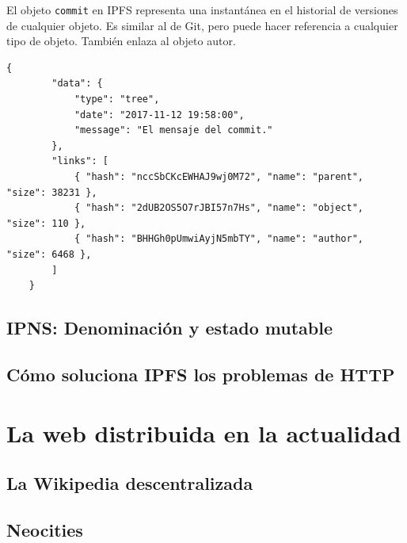 \documentclass[12pt]{article} %
\begin{document}
El objeto \texttt{commit} en IPFS representa una instantánea en el historial de versiones de cualquier objeto. Es similar al de Git, pero puede hacer referencia a cualquier tipo de objeto. También enlaza al objeto autor.

\begin{lstlisting}[caption={Estructura JSON de un \texttt{commit}.}]
	{
		"data": {
			"type": "tree",
			"date": "2017-11-12 19:58:00",
			"message": "El mensaje del commit."
		},
		"links": [
			{ "hash": "nccSbCKcEWHAJ9wj0M72", "name": "parent", "size": 38231 },
			{ "hash": "2dUB2OS5O7rJBI57n7Hs", "name": "object", "size": 110 },
			{ "hash": "BHHGh0pUmwiAyjN5mbTY", "name": "author", "size": 6468 },
		]
	}
\end{lstlisting}



\subsection{IPNS: Denominación y estado mutable} %
\label{sub:ipns_denominación_y_estado_mutable}


\subsection{Cómo soluciona IPFS los problemas de HTTP} %
\label{sub:cómo_soluciona_ipfs_los_problemas_de_http}



\section{La web distribuida en la actualidad} %
\label{sec:la_web_distribuida_en_la_actualidad}

\subsection{La Wikipedia descentralizada} %
\label{sub:la_wikipedia_descentralizada}


\subsection{Neocities} %
\label{sub:neocities}
\end{document}

